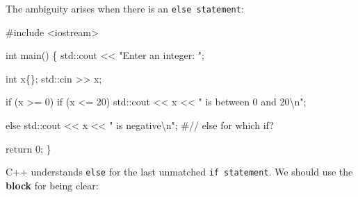 \documentclass[
  letterpaper,
  DIV=11,
  numbers=noendperiod]{scrreprt}
\newenvironment{Shaded}{\begin{snugshade}}{\end{snugshade}}
\newcommand{\CommentTok}[1]{\textcolor[rgb]{0.37,0.37,0.37}{#1}}
\newcommand{\ControlFlowTok}[1]{\textcolor[rgb]{0.00,0.23,0.31}{#1}}
\newcommand{\DecValTok}[1]{\textcolor[rgb]{0.68,0.00,0.00}{#1}}
\newcommand{\ErrorTok}[1]{\textcolor[rgb]{0.68,0.00,0.00}{#1}}
\newcommand{\FunctionTok}[1]{\textcolor[rgb]{0.28,0.35,0.67}{#1}}
\newcommand{\NormalTok}[1]{\textcolor[rgb]{0.00,0.23,0.31}{#1}}
\newcommand{\SpecialCharTok}[1]{\textcolor[rgb]{0.37,0.37,0.37}{#1}}
\newcommand{\StringTok}[1]{\textcolor[rgb]{0.13,0.47,0.30}{#1}}
\begin{document}
The ambiguity arises when there is an \texttt{else\ statement}:

\begin{Shaded}
\begin{Highlighting}[]
\CommentTok{\#include \textless{}iostream\textgreater{}}

\NormalTok{int }\FunctionTok{main}\NormalTok{()}
\NormalTok{\{}
\NormalTok{    std}\SpecialCharTok{::}\NormalTok{cout }\SpecialCharTok{\textless{}}\ErrorTok{\textless{}} \StringTok{"Enter an integer: "}\NormalTok{;}

\NormalTok{    int x\{\};}
\NormalTok{    std}\SpecialCharTok{::}\NormalTok{cin }\SpecialCharTok{\textgreater{}}\ErrorTok{\textgreater{}}\NormalTok{ x;}

    \ControlFlowTok{if}\NormalTok{ (x }\SpecialCharTok{\textgreater{}=} \DecValTok{0}\NormalTok{)}
        \ControlFlowTok{if}\NormalTok{ (x }\SpecialCharTok{\textless{}=} \DecValTok{20}\NormalTok{)}
\NormalTok{            std}\SpecialCharTok{::}\NormalTok{cout }\SpecialCharTok{\textless{}}\ErrorTok{\textless{}}\NormalTok{ x }\SpecialCharTok{\textless{}}\ErrorTok{\textless{}} \StringTok{" is between 0 and 20}\SpecialCharTok{\textbackslash{}n}\StringTok{"}\NormalTok{;}
        
    \ControlFlowTok{else}\NormalTok{ std}\SpecialCharTok{::}\NormalTok{cout }\SpecialCharTok{\textless{}}\ErrorTok{\textless{}}\NormalTok{ x }\SpecialCharTok{\textless{}}\ErrorTok{\textless{}} \StringTok{" is negative}\SpecialCharTok{\textbackslash{}n}\StringTok{"}\NormalTok{; }\CommentTok{\#// else for which if?}

\NormalTok{    return }\DecValTok{0}\NormalTok{;}
\NormalTok{\}}
\end{Highlighting}
\end{Shaded}

C++ understands \texttt{else} for the last unmatched
\texttt{if\ statement}. We should use the \textbf{block} for being
clear:
\end{document}
